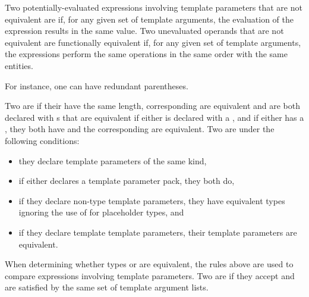 %
Two potentially-evaluated expressions involving template parameters that are not equivalent are
if, for any given set of template arguments, the evaluation of the
expression results in the same value.
Two unevaluated operands that are not equivalent
are functionally equivalent if, for any given set of template arguments,
the expressions perform
the same operations in the same order with the same entities.
\begin{note}
For instance, one can have redundant parentheses.
\end{note}

\pnum
Two  are
 if
their  have the same length,
corresponding  are equivalent
and are both declared with s that are equivalent
if either 
is declared with a ,
and if either  has a ,
they both have
 and the corresponding
 are equivalent.
Two  are
under the following conditions:
\begin{itemize}
\item they declare template parameters of the same kind,
\item if either declares a template parameter pack, they both do,
\item if they declare non-type template parameters,
they have equivalent types
ignoring the use of  for placeholder types, and
\item if they declare template template parameters, their template
parameters are equivalent.
\end{itemize}
When determining whether types or 
are equivalent, the rules above are used to compare expressions
involving template parameters.
Two  are
if they accept and are satisfied by
the same set of template argument lists.

